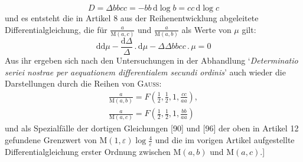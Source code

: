 \[
D=\Delta bbcc=-bb\,\mathrm d\log b=cc\,\mathrm d\log c
\]
und es entsteht die in Artikel 8 aus der Reihenentwicklung abgeleitete Differentialgleichung, die für
$\frac{a}{\mathrm M(a,c)}$ und $\frac{a}{\mathrm M(a,b)}$ als Werte von $\mu$ gilt:
\[
\mathrm{dd}\mu-\frac{\mathrm d\Delta}{\Delta}\mathbin{.}\mathrm d\mu
-\Delta\Delta bbcc\mathbin{.}\mu=0
\]
Aus ihr ergeben sich nach den Untersuchungen in der Abhandlung
`\textit{Determinatio seriei nostrae per aequationem differentialem secundi ordinis}'
auch wieder die Darstellungen durch die Reihen von \textsc{Gauss}:
\[
\begin{gathered}\frac{a}{\mathrm M(a,b)}=F\left(\frac12,\frac12,1,\frac{cc}{aa}\right),\\[7pt]
\frac{a}{\mathrm M(a,c)}=F\left(\frac12,\frac12,1,\frac{bb}{aa}\right)\end{gathered}
\]
und als Spezialfälle der dortigen Gleichungen [90] und [96] der oben in Artikel 12 gefundene Grenzwert von $\mathrm M(1,\varepsilon)\log\frac{4}{\varepsilon}$ und die im vorigen Artikel aufgestellte Differentialgleichung erster Ordnung zwischen
$\mathrm M(a,b)$ und $\mathrm M(a,c)$.]

\clearpage
\endgroup
